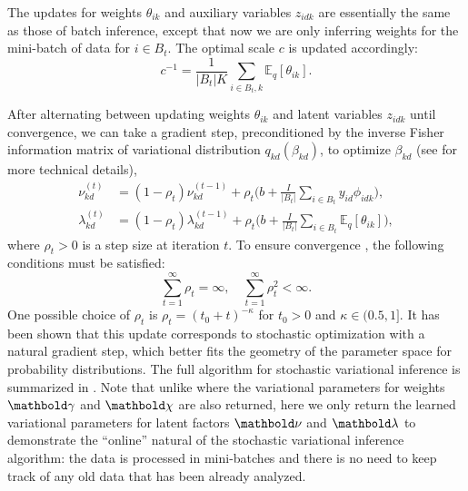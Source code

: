 The updates for weights $\theta_{ik}$ and auxiliary variables $z_{idk}$ are essentially the same as those of batch inference, except that now we are only inferring weights for the mini-batch of data for $i \in B_t$. The optimal scale $c$ is updated accordingly:
\begin{equation*}
c^{-1} = \frac{1}{|B_t| K}\sum_{i \in B_t, k} \mathbb{E}_q [\theta_{ik}].
\end{equation*}

After alternating between updating weights $\theta_{ik}$ and latent variables $z_{idk}$ until convergence, we can take a gradient step,  preconditioned by the inverse Fisher information matrix of variational distribution $q_{kd}(\beta_{kd})$, to optimize $\beta_{kd}$ (see \cite{hoffman2013stochastic} for more technical details), 
\begin{equation*}
\begin{split}
\nu_{kd}^{(t)} &= (1 - \rho_t) \nu_{kd}^{(t-1)} + \rho_t \biggl(b +  \frac{I}{|B_t|}\sum_{i \in B_t} y_{id} \phi_{idk}\biggl),\\
\lambda_{kd}^{(t)} &= (1 - \rho_t) \lambda_{kd}^{(t-1)} + \rho_t \biggl( b +  \frac{I}{|B_t|}\sum_{i \in B_t} \mathbb{E}_q[\theta_{ik}]\biggl),
\end{split}
\end{equation*}
where $\rho_t > 0$ is a step size at iteration $t$. To ensure convergence \citep{bottou1998online}, the following conditions must be satisfied:
\begin{equation*}
\textstyle\sum_{t=1}^\infty\rho_t = \infty,\quad \sum_{t=1}^\infty \rho_t^2 < \infty.
\end{equation*}
One possible choice of $\rho_t$ is $\rho_t = (t_0 + t)^{-\kappa}$ for $t_0 > 0$ and $\kappa \in (0.5, 1]$. It has been shown \citep{hoffman2013stochastic} that this update corresponds to stochastic optimization with a natural gradient step, which better fits the geometry of the parameter space for probability distributions. The full algorithm for stochastic variational inference is summarized in . Note that unlike  where the variational parameters for weights $\mb\gamma$ and $\mb\chi$ are also returned, here we only return the learned variational parameters for latent factors $\mb\nu$ and $\mb\lambda$ to demonstrate the ``online'' natural of the stochastic variational inference algorithm: the data is processed in mini-batches and there is no need to keep track of any old data that has been already analyzed. 

